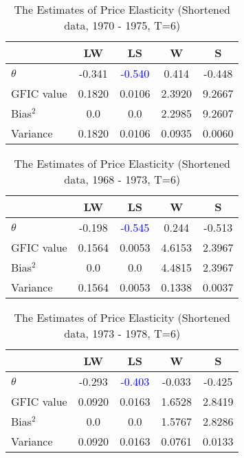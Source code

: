 \documentclass[11pt]{article}
\begin{document}
\newpage

\begin{table}[h!]\centering
 \caption{The Estimates of Price Elasticity (Shortened data, 1970 - 1975, T=6)}
\begin{tabular}{l c c c c }\hline\hline 
 & LW   &      LS   &       W   &      S\\
\hline
$\theta$ & -0.341 & \textcolor{blue}{ -0.540} &  0.414 &  -0.448\\
\hline
GFIC value &0.1820 & 0.0106 & 2.3920& 9.2667\\
Bias$^2$ & 0.0 & 0.0 & 2.2985 & 9.2607\\
Variance &0.1820 & 0.0106 & 0.0935 & 0.0060\\ 
\hline
\hline
\end{tabular}
\end{table}

\begin{table}[h!]\centering
 \caption{The Estimates of Price Elasticity (Shortened data, 1968 - 1973, T=6)}
\begin{tabular}{l c c c c }\hline\hline 
 & LW   &      LS   &       W   &      S\\
\hline
$\theta$ & -0.198 & \textcolor{blue}{ -0.545} &  0.244 &  -0.513\\
\hline
GFIC value &0.1564 & 0.0053 & 4.6153& 2.3967\\
Bias$^2$ & 0.0 & 0.0 & 4.4815 & 2.3967\\
Variance &0.1564 & 0.0053 & 0.1338 & 0.0037\\ 
\hline
\hline
\end{tabular}
\end{table}


\begin{table}[h!]\centering
 \caption{The Estimates of Price Elasticity (Shortened data, 1973 - 1978, T=6)}
\begin{tabular}{l c c c c }\hline\hline 
 & LW   &      LS   &       W   &      S\\
\hline
$\theta$ & -0.293 & \textcolor{blue}{ -0.403} &  -0.033 &  -0.425\\
\hline
GFIC value &0.0920 & 0.0163 & 1.6528 & 2.8419\\
Bias$^2$ & 0.0 & 0.0 & 1.5767 & 2.8286\\
Variance &0.0920 & 0.0163 & 0.0761 & 0.0133\\ 
\hline
\hline
\end{tabular}
\end{table}
\end{document}
